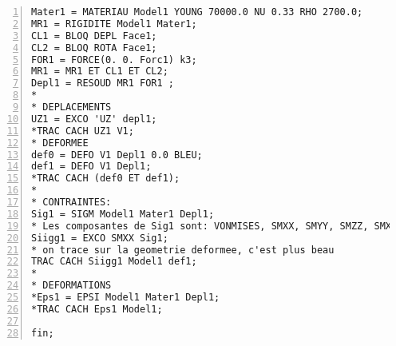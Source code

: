 \scriptsize
\begin{Verbatim}[numbers=left,numbersep=3pt,firstnumber=last]
Mater1 = MATERIAU Model1 YOUNG 70000.0 NU 0.33 RHO 2700.0;
MR1 = RIGIDITE Model1 Mater1;
CL1 = BLOQ DEPL Face1;
CL2 = BLOQ ROTA Face1;
FOR1 = FORCE(0. 0. Forc1) k3;
MR1 = MR1 ET CL1 ET CL2;
Depl1 = RESOUD MR1 FOR1 ;
*
* DEPLACEMENTS
UZ1 = EXCO 'UZ' depl1;
*TRAC CACH UZ1 V1;
* DEFORMEE
def0 = DEFO V1 Depl1 0.0 BLEU;
def1 = DEFO V1 Depl1;
*TRAC CACH (def0 ET def1);
*
* CONTRAINTES: 
Sig1 = SIGM Model1 Mater1 Depl1;
* Les composantes de Sig1 sont: VONMISES, SMXX, SMYY, SMZZ, SMXY, SMXZ, SMYZ
Siigg1 = EXCO SMXX Sig1;
* on trace sur la geometrie deformee, c'est plus beau
TRAC CACH Siigg1 Model1 def1;
*
* DEFORMATIONS
*Eps1 = EPSI Model1 Mater1 Depl1;
*TRAC CACH Eps1 Model1;

fin;
\end{Verbatim}
\normalsize
